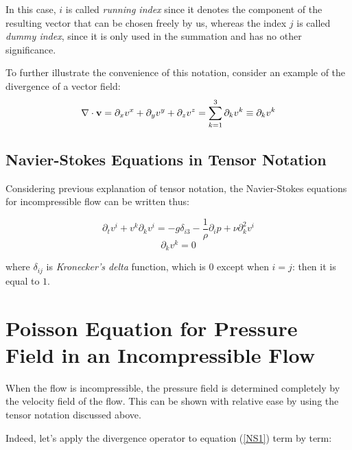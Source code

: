 In this case, $i$ is called \emph{running index} since it denotes the component of the resulting vector that can be chosen freely by us, whereas the index $j$ is called \emph{dummy index}, since it is only used in the summation and has no other significance. 

To further illustrate the convenience of this notation, consider an example of the divergence of a vector field: $$\nabla \cdot \mathbf{v} = \partial_xv^{x} + \partial_yv^{y} + \partial_zv^{z} = \sum_{k=1}^{3}\partial_kv^k \equiv \partial_kv^{k}$$
 
\subsection{Navier-Stokes Equations in Tensor Notation}
 
Considering previous explanation of tensor notation, the Navier-Stokes equations for incompressible flow can be written thus:
 
\begin{equation} \label{NS1-Tensor}
\partial_tv^i + v^k\partial_kv^i = -g\delta_{i3} - \frac{1}{\rho}\partial_ip + \nu \partial_k^2 v^i  
\end{equation}
\begin{equation} \label{NS2-Tensor}
\partial_kv^{k} = 0  
\end{equation}

where $\delta_{ij}$ is \emph{Kronecker's delta} function, which is $0$ except when $i=j$: then it is equal to $1$.

\section{Poisson Equation for Pressure Field in an Incompressible Flow}

When the flow is incompressible, the pressure field is determined completely by the velocity field of the flow. This can be shown with relative ease by using the tensor notation discussed above.

Indeed, let's apply the divergence operator to equation (\ref{NS1}) term by term:

